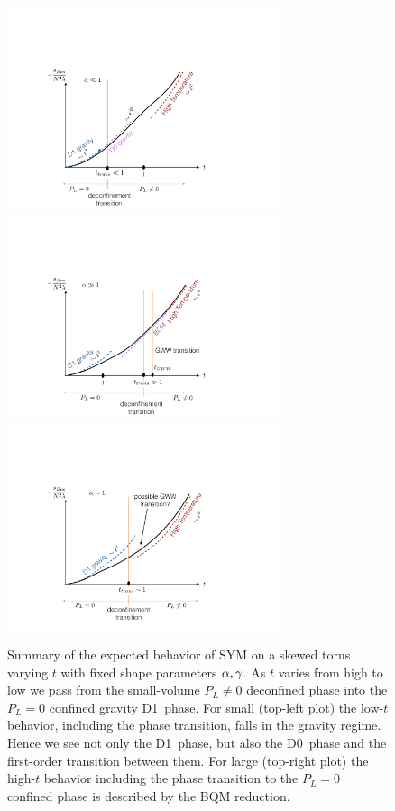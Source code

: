 \begin{figure}[tbp]
  \centering
  \includegraphics[height=6cm]{Figures/FigSummary2.pdf}\hfill \includegraphics[height=6cm]{Figures/FigSummary3.pdf} \\[6 pt]
  \includegraphics[height=6cm]{Figures/FigSummary1.pdf}
  \caption{\label{fig:summaryskew}Summary of the expected behavior of SYM on a skewed torus varying $t$ with fixed shape parameters $\alpha, \gamma$.  As $t$ varies from high to low we pass from the small-volume $P_L \ne 0$ deconfined phase into the $P_L = 0$ confined gravity D1~phase.  For small \al (top-left plot) the low-$t$ behavior, including the phase transition, falls in the gravity regime.  Hence we see not only the D1~phase, but also the D0~phase and the first-order transition between them.  For large \al (top-right plot) the high-$t$ behavior including the phase transition to the $P_L = 0$ confined phase is described by the BQM reduction.}
\end{figure}

